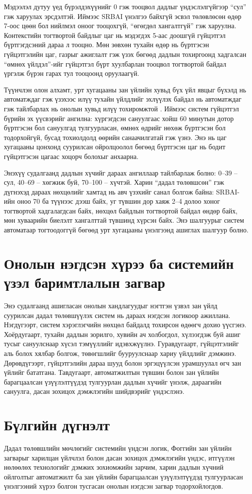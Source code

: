 Мэдээлэл дутуу үед бүрэлдэхүүнийг 0 гэж тооцвол дадлыг үндэслэлгүйгээр ``сул'' гэж харуулах эрсдэлтэй. Иймээс SRBAI үнэлгээ байхгүй эсвэл төлөвлөсөн өдөр 7-оос цөөн бол нийлмэл оноог тооцохгүй, ``өгөгдөл хангалтгүй'' гэж харуулна. Контекстийн тогтвортой байдлыг цаг нь мэдэгдэх 5-аас доошгүй гүйцэтгэл бүртгэгдсэний дараа л тооцно. Мөн зөвхөн тухайн өдөр нь бүртгэсэн гүйцэтгэлийн цаг, газрыг ажиглалт гэж үзэх бөгөөд дадлын тохиргоонд хадгалсан ``өмнөх үйлдэл''-ийг гүйцэтгэл бүрт хуулбарлан тооцвол тогтвортой байдал үргэлж бүрэн гарах тул тооцоонд оруулаагүй.

Түүнчлэн олон алхамт, урт хугацааны зан үйлийн хувьд бүх үйл явцыг бүхэлд нь автоматждаг гэж үзэхээс илүү тухайн үйлдлийг эхлүүлэх байдал нь автоматждаг гэж тайлбарлах нь онолын хувьд илүү тохиромжтой \cite{ref1}. Иймээс систем гүйцэтгэл бүрийн эх үүсвэрийг ангилна: хүргэгдсэн сануулгаас хойш 60 минутын дотор бүртгэсэн бол сануулгад тулгуурласан, өмнөх өдрийг нөхөж бүртгэсэн бол тодорхойгүй, бусад тохиолдолд өөрийн санаачилгатай гэж үзнэ. Энэ нь цаг хугацааны цонхонд суурилсан ойролцоолол бөгөөд бүртгэсэн цаг нь бодит гүйцэтгэсэн цагаас хоцорч болохыг анхаарна.

Энэхүү судалгаанд дадлын хүчийг дараах ангиллаар тайлбарлаж болно: 0--39 -- сул, 40--69 -- хөгжиж буй, 70--100 -- хүчтэй. Харин ``дадал төлөвшсөн'' гэж дүгнэхэд дараах нөхцөлийг хамтад нь авч үзэхийг санал болгож байна: SRBAI-ийн оноо 70 ба түүнээс дээш байх, уг түвшин дор хаяж 2--4 долоо хоног тогтвортой хадгалагдсан байх, нөхцөл байдлын тогтвортой байдал өндөр байх, мөн хуваарийн биелэлт хангалттай түвшинд хүрсэн байх. Энэ шалгуурыг систем автоматаар тогтоодоггүй бөгөөд урт хугацааны үнэлгээнд ашиглах шалгуур болно.

\section{Онолын нэгдсэн хүрээ ба системийн үзэл баримтлалын загвар}

Энэ судалгаанд ашигласан онолын хандлагуудыг нэгтгэн үзвэл зан үйлд суурилсан дадал төлөвшүүлэх систем нь дараах нэгдсэн логикоор ажиллана. Нэгдүгээрт, систем хэрэглэгчийн нөхцөл байдалд тохирсон өдөөгч дохио үүсгэнэ. Хоёрдугаарт, тухайн дадлын зорилго, хувийн ач холбогдол, хүлээгдэж буй ашиг тусыг сануулснаар хүсэл тэмүүллийг идэвхжүүлнэ. Гуравдугаарт, гүйцэтгэлийг аль болох хялбар болгож, төвөгшлийг бууруулснаар хариу үйлдлийг дэмжинэ. Дөрөвдүгээрт, гүйцэтгэлийн дараа шууд болон эргэцүүлсэн урамшуулал өгч зан үйлийг бататгана. Тавдугаарт, автоматжилтын түвшин болон зан үйлийн барагцаалсан үзүүлэлтүүдэд тулгуурлан дадлын хүчийг үнэлж, дараагийн сануулга, дасан зохицох дэмжлэгийн шийдвэрийг үндэслэнэ.

\section{Бүлгийн дүгнэлт}

Дадал төлөвшлийн мөчлөгийг системийн үндсэн логик, Фоггийн зан үйлийн загварыг харилцан үйлчлэл болон дасан зохицох дэмжлэгийн үндэс, итгүүлэн нөлөөлөх технологийг дэмжих зохиомжийн зарчим, харин дадлын хүчний ойлголтыг автоматжилт ба зан үйлийн барагцаалсан үзүүлэлтүүдэд тулгуурласан үнэлгээний хүрээ болгон тусгасан онолын нэгдсэн загвар тодорхойлогдов.
